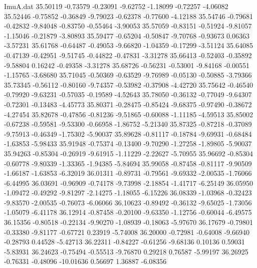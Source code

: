 \begin{filecontents}{ImuA.dat}
  35.50119   -0.73579   -0.23091   -9.62752   -1.18099   -0.72257   -4.06082
  35.52446   -0.75852   -0.36849   -9.79023   -0.62378   -0.77600   -4.12188
  35.54746   -0.79681   -0.42832   -9.84048   -0.83750   -0.55464   -3.90053
  35.57059   -0.83151   -0.51924   -9.81057   -1.15046   -0.21879   -3.80893
  35.59477   -0.65204   -0.50847   -9.70768   -0.93673    0.06363   -3.57231
  35.61768   -0.64487   -0.49053   -9.66820   -1.04359   -0.17299   -3.51124
  35.64085   -0.47139   -0.42951   -9.51745   -0.44822   -0.47831   -3.31278
  35.66413   -0.52403   -0.35892   -9.58804    0.16242   -0.49358   -3.31278
  35.68726   -0.56231   -0.53001   -9.84168   -0.00551   -1.15765   -3.68680
  35.71045   -0.50369   -0.63529   -9.76989   -0.05130   -0.50885   -3.79366
  35.73345   -0.56112   -0.80160   -9.74357   -0.53982   -0.37908   -4.42720
  35.75642   -0.46540   -0.79920   -9.63231   -0.57035   -0.19589   -4.52643
  35.78050   -0.36132   -0.77049   -9.64307   -0.72301   -0.13483   -4.45773
  35.80371   -0.28475   -0.85424   -9.68375   -0.97490   -0.38672   -4.27454
  35.82678   -0.47856   -0.81236   -9.51865   -0.60088   -1.11185   -4.59513
  35.85002   -0.67238   -0.59581   -9.53300   -0.66958   -1.86752   -5.21340
  35.87325   -0.87218   -0.37089   -9.75913   -0.46349   -1.75302   -5.90037
  35.89628   -0.81117   -0.18784   -9.69931   -0.68484   -1.63853   -5.98433
  35.91948   -0.75374   -0.13400   -9.70290   -1.27258   -1.89805   -5.90037
  35.94263   -0.85304   -0.26919   -9.61915   -1.11229   -2.22627   -5.70955
  35.96692   -0.85304   -0.60778   -9.80339   -1.33365   -1.94385   -5.84694
  35.99058   -0.87458   -0.81117   -9.90509   -1.66187   -1.63853   -6.32019
  36.01311   -0.89731   -0.79561   -9.69332   -2.00535   -1.76066   -6.44995
  36.03691   -0.96909   -0.74178   -9.73998   -2.18854   -1.41717   -6.25149
  36.05950   -1.09472   -0.49292   -9.81297   -2.14275   -1.18055   -6.15226
  36.08339   -1.03968   -0.32423   -9.83570   -2.00535   -0.76073   -6.06066
  36.10623   -0.89492   -0.36132   -9.65025   -1.73056   -1.05079   -6.41178
  36.12914   -0.87458   -0.20100   -9.63350   -1.12756   -0.60044   -6.49575
  36.15356   -0.80518   -0.22134   -9.90270   -1.08939   -0.18063   -5.97670
  36.17679   -0.79801   -0.33380   -9.81177   -0.67721    0.23919   -5.74008
  36.20000   -0.72981   -0.64008   -9.66940   -0.28793    0.44528   -5.42713
  36.22311   -0.84227   -0.61256   -9.68136    0.10136    0.59031   -5.83931
  36.24623   -0.75494   -0.55513   -9.76870    0.29218    0.76587   -5.99197
  36.26925   -0.76331   -0.48096  -10.01636    0.56697    1.36887   -6.08356

\end{filecontents}

